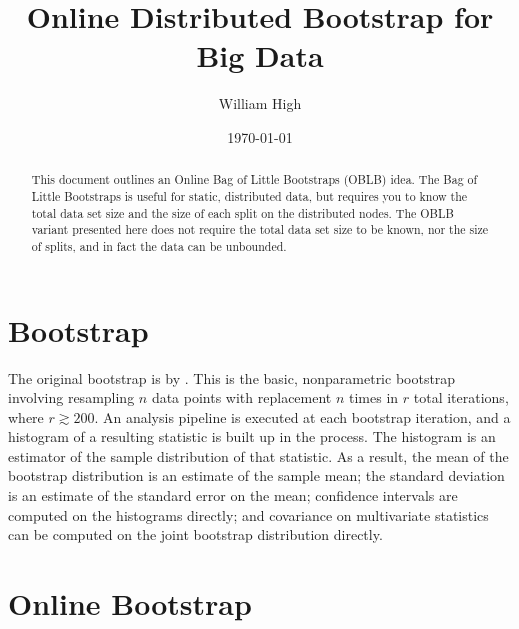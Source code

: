 \documentclass{article}
\begin{document}
%

\title{Online Distributed Bootstrap for Big Data}
\author{William High}
\date{\today}
\maketitle

\begin{abstract}

This document outlines an Online Bag of Little Bootstraps (OBLB) idea. The Bag
of Little Bootstraps is useful for static, distributed data, but requires you
to know the total data set size and the size of each split on the distributed
nodes. The OBLB variant presented here does not require the total data set
size to be known, nor the size of splits, and in fact the data can be
unbounded.

\end{abstract}

\section{Bootstrap}

The original bootstrap is by \cite{bib:efron}. This is the basic,
nonparametric bootstrap involving resampling $n$ data points with replacement
$n$ times in $r$ total iterations, where $r \gtrsim 200$. An analysis pipeline
is executed at each bootstrap iteration, and a histogram of a resulting
statistic is built up in the process. The histogram is an estimator of the
sample distribution of that statistic. As a result, the mean of the bootstrap
distribution is an estimate of the sample mean; the standard deviation is an
estimate of the standard error on the mean; confidence intervals are computed
on the histograms directly; and covariance on multivariate statistics can be
computed on the joint bootstrap distribution directly.

\section{Online Bootstrap}
\end{document}
